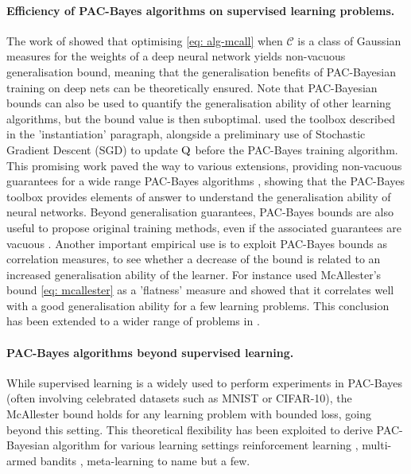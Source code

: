 \paragraph{Efficiency of PAC-Bayes algorithms on supervised learning problems.}
The work of \citet{dziugaite2017computing} showed that optimising \eqref{eq: alg-mcall} when $\mathcal{C}$ is a class of Gaussian measures for the weights of a deep neural network yields non-vacuous generalisation bound, meaning that the generalisation benefits of PAC-Bayesian training on deep nets can be theoretically ensured. Note that PAC-Bayesian bounds can also be used to quantify the generalisation ability of other learning algorithms, but the bound value is then suboptimal.  \citet{dziugaite2017computing} used the toolbox described in the 'instantiation' paragraph, alongside a preliminary use of Stochastic Gradient Descent (SGD) to update $\mathrm{Q}$ before the PAC-Bayes training algorithm. This promising work paved the way to various extensions, providing non-vacuous guarantees for a wide range PAC-Bayes algorithms \citep{rivasplata2019pac,letarte2019dichotomize,perezortiz2021learning,perez2021progress,perez2021tighter,dziugaite2021role,biggs2022non,biggs2023tighter}, showing that the PAC-Bayes toolbox provides elements of answer to understand the generalisation ability of neural networks. Beyond generalisation guarantees, PAC-Bayes bounds are also useful to propose original training methods, even if the associated guarantees are vacuous \citep{biggs2021differentiable,biggs2022margin}. Another important empirical use is to exploit PAC-Bayes bounds as correlation measures, to see whether a decrease of the bound is related to an increased generalisation ability of the learner. For instance \citet{neyshabur2017explor} used McAllester's bound \eqref{eq: mcallester} as a 'flatness' measure and showed that it correlates well with a good generalisation ability for a few learning problems. This conclusion has been extended to a wider range of problems in \citet{jiang2020fantastic,dziugaite2020search}. 

\paragraph{PAC-Bayes algorithms beyond supervised learning.} While supervised learning is a widely used to perform experiments in PAC-Bayes (often involving celebrated datasets such as MNIST or CIFAR-10), the McAllester bound holds for any learning problem with bounded loss, going beyond this setting. This theoretical flexibility has been exploited to derive PAC-Bayesian algorithm for various learning settings reinforcement learning \citep{fard2010pac}, multi-armed bandits \citep{seldin2011pac,seldin2012pac,sakhi2023pac}, meta-learning \citep{amit2018meta,farid2021generalization,rothfuss2021pacoh,rothfuss2022pac,ding2021bridging} to name but a few. 

